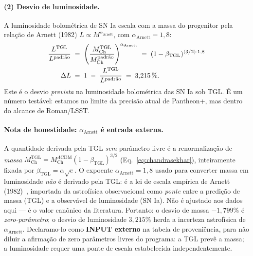 \documentclass[12pt,a4paper]{article}
\newcommand{\betatgl}{\beta_{\text{TGL}}}
\newcommand{\TGL}{\textsc{TGL}}
\begin{document}
\paragraph{(2) Desvio de luminosidade.}
A luminosidade bolométrica de SN Ia escala com a massa do progenitor pela
relação de Arnett (1982) $L \propto M^{\alpha_{\text{Arnett}}}$, com
$\alpha_{\text{Arnett}} = 1{,}8$:
\begin{align}
\frac{L^{\text{TGL}}}{L^{\text{padrão}}}
&\;=\; \left( \frac{M_{\text{Ch}}^{\text{TGL}}}{M_{\text{Ch}}^{\text{padrão}}} \right)^{\alpha_{\text{Arnett}}}
\;=\; (1 - \betatgl)^{(3/2)\cdot 1{,}8} \notag\\
\Delta L &\;=\; 1 \;-\; \frac{L^{\text{TGL}}}{L^{\text{padrão}}}
              \;=\; 3{,}215\,\%.
\label{eq:dL-TGL}
\end{align}
Este é o desvio \emph{prevista} na luminosidade bolométrica das SN Ia
sob \TGL{}.  É um número testável: estamos no limite da precisão atual
de Pantheon+, mas dentro do alcance de Roman/LSST.

\paragraph{Nota de honestidade: $\alpha_{\text{Arnett}}$ é entrada externa.}
A quantidade derivada pela \TGL{} \emph{sem} parâmetro livre é a renormalização
de \emph{massa} $M_{\text{Ch}}^{\text{TGL}} = M_{\text{Ch}}^{\Lambda\text{CDM}}(1-\betatgl)^{3/2}$
(Eq.~\ref{eq:chandrasekhar}), inteiramente fixada por $\betatgl = \alpha\sqrt{e}$.
O expoente $\alpha_{\text{Arnett}} = 1{,}8$ usado para converter massa em
luminosidade \emph{não} é derivado pela \TGL{}: é a lei de escala empírica de
Arnett (1982)~\cite{Arnett1982}, importada da astrofísica observacional como
\emph{ponte} entre a predição de massa (\TGL{}) e a observável de luminosidade
(SN Ia).  Não é ajustado aos dados aqui --- é o valor canônico da literatura.
Portanto: o desvio de massa $-1{,}799\%$ é \emph{zero-parâmetro}; o desvio de
luminosidade $3{,}215\%$ herda a incerteza astrofísica de $\alpha_{\text{Arnett}}$.
Declaramo-lo como \textbf{INPUT externo} na tabela de proveniência, para não
diluir a afirmação de zero parâmetros livres do programa: a \TGL{} prevê a
massa; a luminosidade requer uma ponte de escala estabelecida independentemente.
\end{document}
